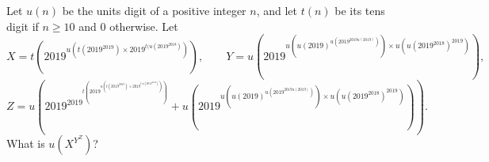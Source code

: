 Let $u(n)$ be the units digit of a positive integer $n$, and let $t(n)$ be its tens digit if $n\ge10$ and $0$ otherwise. Let
\[
X=t\left(2019^{u(t(2019^{2019}) \times 2019^{t(u(2019^{2018})})}\right),\qquad Y=u\left(2019^{u(u(2019)^{u(2019^{2019 u(2019)})}) \times u(u(2019^{2018})^{2019})}\right),
\]
\[
Z=u\left(2019^{2019^{t\left(2019^{u(t(2019^{2019}) \times 2019^{t(u(2019^{2018})})}\right)}}+u\left(2019^{u(u(2019)^{u(2019^{2019 u(2019)})}) \times u(u(2019^{2018})^{2019})}\right)\right).
\]
What is $u\left(X^{Y^{Z}}\right)$?
